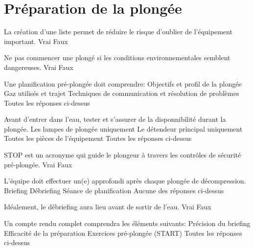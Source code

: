 \documentclass[english,12pt,a4paper]{article}
\begin{document}
	\section{Préparation de la plongée}
	\begin{outline}
		\1 La création d'une liste permet de réduire le risque d'oublier de l'équipement important.
			\2 Vrai
			\2 Faux

		\1 Ne pas commencer une plongé si les conditions environnementales semblent dangereuses.
			\2 Vrai
			\2 Faux

		\1 Une planification pré-plongée doit comprendre:
			\2 Objectifs et profil de la plongée
			\2 Gaz utilisés et trajet
			\2 Techniques de communication et résolution de problèmes
			\2 Toutes les réponses ci-dessus

		\1 Avant d'entrer dans l'eau, tester \underline{\hspace{1.5cm}} et s'assurer de la disponnibilité durant la plongée.
			\2 Les lampes de plongée uniquement
			\2 Le détendeur principal uniquement
			\2 Toutes les pièces de l'équipement
			\2 Toutes les réponses ci-dessus

		\1 STOP est un acronyme qui guide le plongeur à travers les contrôles de sécurité pré-plongée.
			\2 Vrai
			\2 Faux

		\1 L'équipe doit effectuer un(e) \underline{\hspace{1.5cm}} approfondi après chaque plongée de décompression.
			\2 Briefing
			\2 Débriefing
			\2 Séance de planification
			\2 Aucune des réponses ci-dessus

		\1 Idéalement, le débriefing aura lieu avant de sortir de l'eau.
			\2 Vrai
			\2 Faux

		\1 Un compte rendu complet comprendra les éléments suivants:
			\2 Précision du briefing
			\2 Efficacité de la préparation
			\2 Exercices pré-plongée (START)
			\2 Toutes les réponses ci-dessus
	\end{outline}
	\pagebreak
\end{document}
